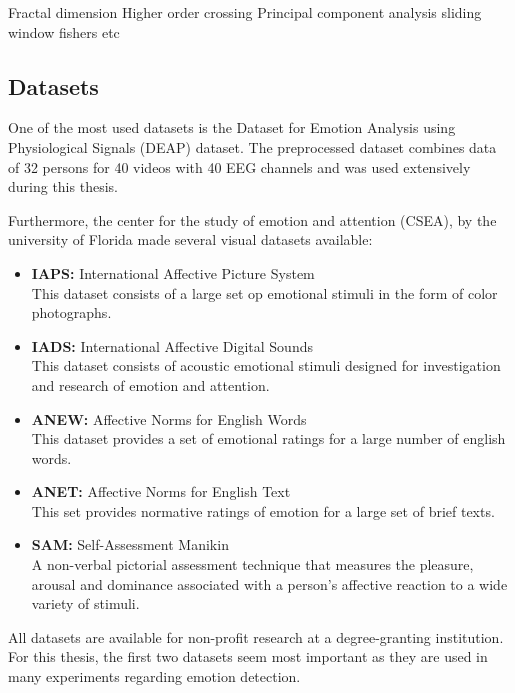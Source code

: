 Fractal dimension %
Higher order crossing
Principal component analysis
sliding window
fishers
etc


\subsection{Datasets}
One of the most used datasets is the Dataset for Emotion Analysis using Physiological Signals (DEAP) dataset\cite{DEAP}. The preprocessed dataset combines data of 32 persons for 40 videos with 40 EEG channels and was used extensively during this thesis.

\npar

Furthermore, the center for the study of emotion and attention (CSEA), by the university of Florida made several visual datasets available:
\begin{itemize}
\item \textbf{IAPS:} International Affective Picture System\\
This dataset consists of a large set op emotional stimuli in the form of color photographs.
\item \textbf{IADS:} International Affective Digital Sounds \\
This dataset consists of acoustic emotional stimuli designed for investigation and research of emotion and attention.
\item \textbf{ANEW:} Affective Norms for English Words\\
This dataset provides a set of emotional ratings for a large number of english words.
\item \textbf{ANET:} Affective Norms for English Text\\
This set provides normative ratings of emotion for a large set of brief texts.
\item \textbf{SAM:} Self-Assessment Manikin\\
A non-verbal pictorial assessment technique that measures the pleasure, arousal and dominance associated with a person's affective reaction to a wide variety of stimuli.
\end{itemize}
All datasets are available for non-profit research at a degree-granting institution\cite{DataSets}. For this thesis, the first two datasets seem most important as they are used in many experiments regarding emotion detection\cite{ExtendedPaper}\cite{EmotionSite}\cite{RealTimeEEGEmotion}\cite{EEGDatasets}.

